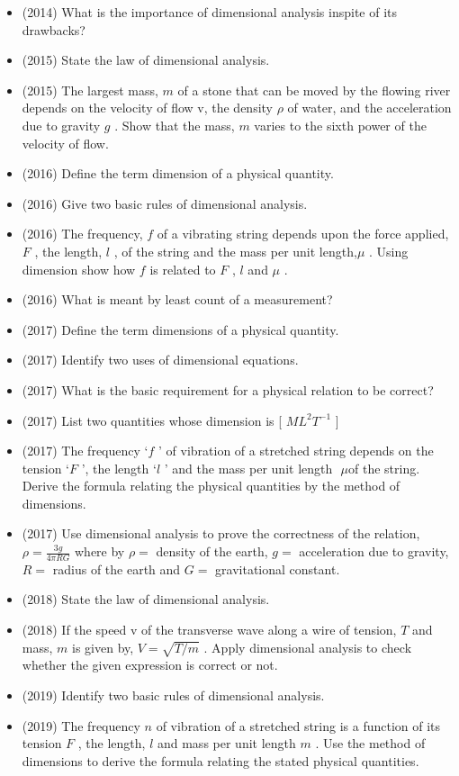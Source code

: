 \documentclass{article}
\begin{document}
\begin{itemize}
\begin{itemize}
\end{itemize}
\item (2014)  What is the importance of dimensional analysis inspite of its drawbacks?
\item (2015)  State the law of dimensional analysis.
\item (2015)  The largest mass, $ m$ of a stone that can be moved by the flowing river depends on the velocity of flow v, the density $ \rho $ of water, and the acceleration due to gravity $ g$ . Show that the mass, $ m$ varies to the sixth power of the velocity of flow.
\item (2016)  Define the term dimension of a physical quantity.
\item (2016)  Give two basic rules of dimensional analysis. 
\item (2016)  The frequency, $ f$ of a vibrating string depends upon the force applied, $ F$ , the length, $ l$ , of the string and the mass per unit length,$ \mu $ . Using dimension show how $ f$ is related to $ F$ , $ l$ and $ \mu $ .
\item (2016)  What is meant by least count of a measurement?
\item (2017)  Define the term dimensions of a physical quantity. 
\item (2017)  Identify two uses of dimensional equations.
\item (2017)  What is the basic requirement for a physical relation to be correct? 
\item (2017)  List two quantities whose dimension is [ $ ML^{2}T^{-1}$ ]
\item (2017)  The frequency ‘$ f$ ’ of vibration of a stretched string depends on the tension ‘$ F$ ’, the length ‘$ l$ ’ and the mass per unit length $ $ $\mu$of the string. Derive the formula relating the physical quantities by the method of dimensions. 
\item (2017)  Use dimensional analysis to prove the correctness of the relation, $ \rho = \frac{3g}{4 \pi RG}$ where by $ \rho =$ density of the earth, $ g=$ acceleration due to gravity, $ R=$ radius of the earth and $ G=$ gravitational constant.
\item (2018)  State the law of dimensional analysis. 
\item (2018)  If the speed v of the transverse wave along a wire of tension, $ T$ and mass, $ m$ is given by, $ V=\sqrt{T/m}$ .  Apply dimensional analysis to check whether the given expression is correct or not.  
\item (2019)  Identify two basic rules of dimensional analysis.
\item (2019)  The frequency $ n$ of vibration of a stretched string is a function of its tension $ F$ , the length, $ l$ and mass per unit length $ m$ . Use the method of dimensions to derive the formula relating the stated physical quantities.
\end{itemize}
\end{document}
